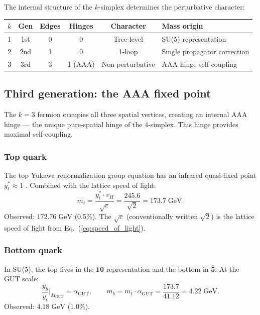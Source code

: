 The internal structure of the $k$-simplex determines the perturbative character:

\begin{center}
\begin{tabular}{cccccl}
\hline
$k$ & Gen & Edges & Hinges & Character & Mass origin \\
\hline
1 & 1st & 0 & 0 & Tree-level & SU(5) representation \\
2 & 2nd & 1 & 0 & 1-loop & Single propagator correction \\
3 & 3rd & 3 & 1 (AAA) & Non-perturbative & AAA hinge self-coupling \\
\hline
\end{tabular}
\end{center}

\subsection{Third generation: the AAA fixed point}

The $k = 3$ fermion occupies all three spatial vertices, creating an internal AAA hinge --- the unique pure-spatial hinge of the 4-simplex. This hinge provides maximal self-coupling.

\subsubsection{Top quark}

The top Yukawa renormalization group equation has an infrared quasi-fixed point $y^*_t \approx 1$ \cite{Pendleton, Hill}. Combined with the lattice speed of light:
\begin{equation}
m_t = \frac{y^*_t \cdot v_H}{\sqrt{c}} = \frac{245.6}{\sqrt{2}} = 173.7\;\text{GeV}.
\end{equation}
Observed: $172.76\;\text{GeV}$ (0.5\%). The $\sqrt{c}$ (conventionally written $\sqrt{2}$) is the lattice speed of light from Eq.~(\ref{eq:speed_of_light}).

\subsubsection{Bottom quark}

In SU(5), the top lives in the $\mathbf{10}$ representation and the bottom in $\bar{\mathbf{5}}$. At the GUT scale:
\begin{equation}
\frac{y_b}{y_t}\bigg|_{M_\text{GUT}} = \alpha_\text{GUT}, \qquad m_b = m_t \cdot \alpha_\text{GUT} = \frac{173.7}{41.12} = 4.22\;\text{GeV}.
\end{equation}
Observed: $4.18\;\text{GeV}$ (1.0\%).

